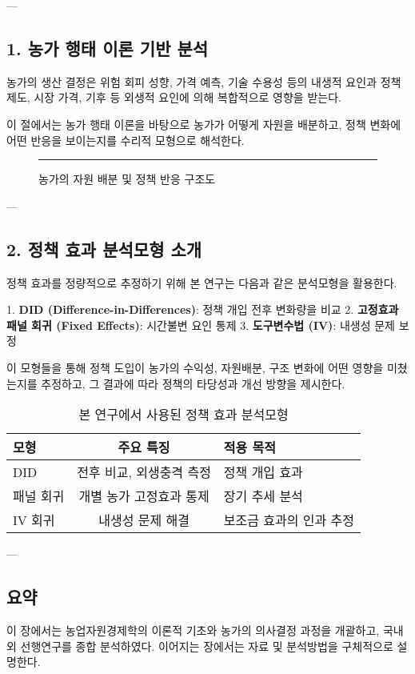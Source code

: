 ---

\subsection{1. 농가 행태 이론 기반 분석}

농가의 생산 결정은 위험 회피 성향, 가격 예측, 기술 수용성 등의 내생적 요인과  
정책 제도, 시장 가격, 기후 등 외생적 요인에 의해 복합적으로 영향을 받는다.

이 절에서는 농가 행태 이론을 바탕으로 농가가 어떻게 자원을 배분하고,  
정책 변화에 어떤 반응을 보이는지를 수리적 모형으로 해석한다.

\begin{figure}[htbp]
  \centering
  \rule{0.75\linewidth}{5cm}
  \caption{농가의 자원 배분 및 정책 반응 구조도}\label{fig:chapter2_2}
\end{figure}

---

\subsection{2. 정책 효과 분석모형 소개}

정책 효과를 정량적으로 추정하기 위해 본 연구는 다음과 같은 분석모형을 활용한다.

1. \textbf{DID (Difference-in-Differences)}: 정책 개입 전후 변화량을 비교  
2. \textbf{고정효과 패널 회귀 (Fixed Effects)}: 시간불변 요인 통제  
3. \textbf{도구변수법 (IV)}: 내생성 문제 보정

이 모형들을 통해 정책 도입이 농가의 수익성, 자원배분, 구조 변화에 어떤 영향을 미쳤는지를 추정하고,  
그 결과에 따라 정책의 타당성과 개선 방향을 제시한다.

\begin{table}[htbp]
  \centering
  \begin{tabular}{|l|c|l|}
    \hline
    모형 & 주요 특징 & 적용 목적 \\
    \hline
    DID & 전후 비교, 외생충격 측정 & 정책 개입 효과 \\
    패널 회귀 & 개별 농가 고정효과 통제 & 장기 추세 분석 \\
    IV 회귀 & 내생성 문제 해결 & 보조금 효과의 인과 추정 \\
    \hline
  \end{tabular}
  \caption{본 연구에서 사용된 정책 효과 분석모형}\label{tab:chapter2_2}
\end{table}

---

\subsection{요약}

이 장에서는 농업자원경제학의 이론적 기초와 농가의 의사결정 과정을 개괄하고,  
국내외 선행연구를 종합 분석하였다. 이어지는 장에서는 자료 및 분석방법을 구체적으로 설명한다.
